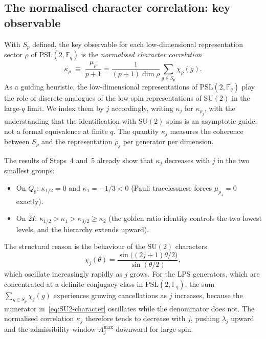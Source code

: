 \documentclass[11pt,a4paper]{article}
\begin{document}
  \subsection{The normalised character correlation: key observable}
    \label{sec:step6a-coherence}

    With $S_p$ defined, the key observable for each low-dimensional
    representation sector $\rho$ of $\mathrm{PSL}(2,\mathbb{F}_q)$ is the
    \emph{normalised character correlation}
    \begin{equation}
      \kappa_\rho \;\equiv\; \frac{\mu_\rho}{p+1}
      = \frac{1}{(p+1)\dim\rho} \sum_{g \in S_p} \chi_\rho(g).
      \label{eq:coherence}
    \end{equation}
    As a guiding heuristic, the low-dimensional representations of
    $\mathrm{PSL}(2,\mathbb{F}_q)$ play the role of discrete analogues of
    the low-spin representations of $\mathrm{SU}(2)$ in the large-$q$ limit.
    We index them by $j$ accordingly, writing $\kappa_j$ for $\kappa_{\rho_j}$,
    with the understanding that the identification with $\mathrm{SU}(2)$ spins
    is an asymptotic guide, not a formal equivalence at finite $q$.
    The quantity $\kappa_j$ measures the coherence between $S_p$ and the
    representation $\rho_j$ per generator per dimension.

    The results of Steps~4 and~5 already show that $\kappa_j$ decreases
    with $j$ in the two smallest groups:
    \begin{itemize}
      \item On $Q_8$: $\kappa_{1/2} = 0$ and $\kappa_1 = -1/3 < 0$
      (Pauli tracelessness forces $\mu_{\rho_4} = 0$ exactly).
      \item On $2I$: $\kappa_{1/2} > \kappa_1 > \kappa_{3/2} \geq \kappa_2$
      (the golden ratio identity controls the two lowest levels, and the
      hierarchy extends upward).
    \end{itemize}
    The structural reason is the behaviour of the $\mathrm{SU}(2)$ characters
    \begin{equation}
      \chi_j(\theta) = \frac{\sin\bigl((2j+1)\theta/2\bigr)}{\sin(\theta/2)},
      \label{eq:SU2-character}
    \end{equation}
    which oscillate increasingly rapidly as $j$ grows.
    For the LPS generators, which are concentrated at a definite conjugacy
    class in $\mathrm{PSL}(2,\mathbb{F}_q)$, the sum $\sum_{g \in S_p}
\chi_j(g)$ experiences growing cancellations as $j$ increases, because
    the numerator in~\eqref{eq:SU2-character} oscillates while the
    denominator does not.
    The normalised correlation $\kappa_j$ therefore tends to decrease with
    $j$, pushing $\lambda_j$ upward and the admissibility window
    $A^{\max}_j$ downward for large spin.
\end{document}
